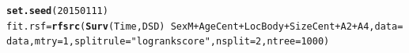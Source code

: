 \documentclass{article}\usepackage[]{graphicx}\usepackage[]{color}
\makeatletter
\newcommand{\hlnum}[1]{\textcolor[rgb]{0.686,0.059,0.569}{#1}}%
\newcommand{\hlstr}[1]{\textcolor[rgb]{0.192,0.494,0.8}{#1}}%
\newcommand{\hlopt}[1]{\textcolor[rgb]{0,0,0}{#1}}%
\newcommand{\hlstd}[1]{\textcolor[rgb]{0.345,0.345,0.345}{#1}}%
\newcommand{\hlkwb}[1]{\textcolor[rgb]{0.69,0.353,0.396}{#1}}%
\newcommand{\hlkwc}[1]{\textcolor[rgb]{0.333,0.667,0.333}{#1}}%
\newcommand{\hlkwd}[1]{\textcolor[rgb]{0.737,0.353,0.396}{\textbf{#1}}}%
\newenvironment{kframe}{%
 \def\at@end@of@kframe{}%
 \ifinner\ifhmode%
  \def\at@end@of@kframe{\end{minipage}}%
  \begin{minipage}{\columnwidth}%
 \fi\fi%
 \def\FrameCommand##1{\hskip\@totalleftmargin \hskip-\fboxsep
 \colorbox{shadecolor}{##1}\hskip-\fboxsep
     \hskip-\linewidth \hskip-\@totalleftmargin \hskip\columnwidth}%
 \MakeFramed {\advance\hsize-\width
   \@totalleftmargin\z@ \linewidth\hsize
   \@setminipage}}%
 {\par\unskip\endMakeFramed%
 \at@end@of@kframe}
\newenvironment{knitrout}{}{} %
\makeatother
\begin{document}
\begin{knitrout}
\color{fgcolor}\begin{kframe}
\begin{alltt}
\hlkwd{set.seed}\hlstd{(}\hlnum{20150111}\hlstd{)}
\hlstd{fit.rsf} \hlkwb{=} \hlkwd{rfsrc}\hlstd{(}\hlkwd{Surv}\hlstd{(Time, DSD)} \hlopt{~} \hlstd{SexM} \hlopt{+} \hlstd{AgeCent} \hlopt{+} \hlstd{LocBody} \hlopt{+} \hlstd{SizeCent} \hlopt{+} \hlstd{A2} \hlopt{+} \hlstd{A4,} \hlkwc{data} \hlstd{= data,} \hlkwc{mtry} \hlstd{=} \hlnum{1}\hlstd{,} \hlkwc{splitrule} \hlstd{=} \hlstr{"logrankscore"}\hlstd{,} \hlkwc{nsplit} \hlstd{=} \hlnum{2}\hlstd{,} \hlkwc{ntree} \hlstd{=} \hlnum{1000}\hlstd{)}
\end{alltt}
\end{kframe}
\end{knitrout}
\end{document}

